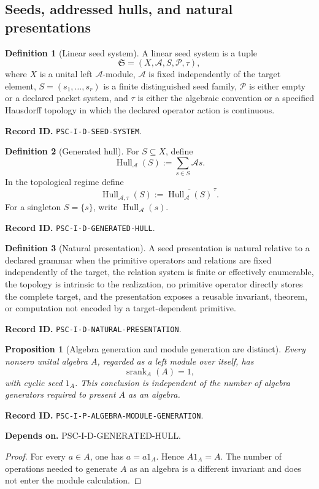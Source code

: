 \documentclass[11pt]{article}
\newtheorem{proposition}[proposition]{Proposition}
\theoremstyle{definition}
\newtheorem{definition}[definition]{Definition}
\theoremstyle{remark}
\newcommand{\A}{\mathcal A}
\newcommand{\Pcal}{\mathcal P}
\newcommand{\Hull}{\operatorname{Hull}}
\newcommand{\srank}{\operatorname{srank}}
\newcommand{\cl}[1]{\overline{#1}}
\newcommand{\RecordID}[1]{\par\smallskip\noindent\begingroup\footnotesize\color{PSCGray}\raggedright\textbf{Record ID.} \nolinkurl{#1}.\par\endgroup}
\newcommand{\Depends}[1]{\par\noindent\begingroup\footnotesize\color{PSCGray}\raggedright\textbf{Depends on.} #1\par\endgroup}
\begin{document}
\subsection{Seeds, addressed hulls, and natural presentations}
\begin{definition}[Linear seed system]
\label{def:seed-system}
A linear seed system is a tuple
\[
\mathfrak S=(X,\A,S,\Pcal,\tau),
\]
where $X$ is a unital left $\A$-module, $\A$ is fixed independently of the target element, $S=(s_1,\ldots,s_r)$ is a finite distinguished seed family, $\Pcal$ is either empty or a declared packet system, and $\tau$ is either the algebraic convention or a specified Hausdorff topology in which the declared operator action is continuous.
\end{definition}
\RecordID{PSC-I-D-SEED-SYSTEM}

\begin{definition}[Generated hull]
\label{def:generated-hull}
For $S\subseteq X$, define
\[
\Hull_{\A}(S):=\sum_{s\in S}\A s.
\]
In the topological regime define
\[
\Hull_{\A,\tau}(S):=\cl{\Hull_{\A}(S)}^{\,\tau}.
\]
For a singleton $S=\{s\}$, write $\Hull_{\A}(s)$.
\end{definition}
\RecordID{PSC-I-D-GENERATED-HULL}

\begin{definition}[Natural presentation]
\label{def:natural-presentation}
A seed presentation is natural relative to a declared grammar when the primitive operators and relations are fixed independently of the target, the relation system is finite or effectively enumerable, the topology is intrinsic to the realization, no primitive operator directly stores the complete target, and the presentation exposes a reusable invariant, theorem, or computation not encoded by a target-dependent primitive.
\end{definition}
\RecordID{PSC-I-D-NATURAL-PRESENTATION}

\begin{proposition}[Algebra generation and module generation are distinct]
\label{prop:algebra-module-generation}
Every nonzero unital algebra $A$, regarded as a left module over itself, has
\[
\srank_A(A)=1,
\]
with cyclic seed $1_A$.  This conclusion is independent of the number of algebra generators required to present $A$ as an algebra.
\end{proposition}
\RecordID{PSC-I-P-ALGEBRA-MODULE-GENERATION}
\Depends{PSC-I-D-GENERATED-HULL.}

\begin{proof}
For every $a\in A$, one has $a=a1_A$.  Hence $A1_A=A$.  The number of operations needed to generate $A$ as an algebra is a different invariant and does not enter the module calculation.
\end{proof}
\end{document}
